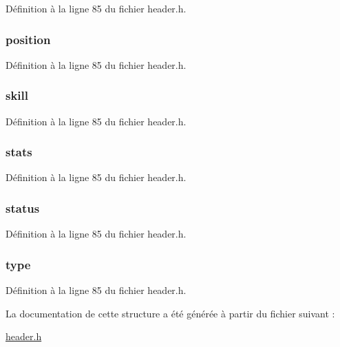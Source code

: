 Définition à la ligne 85 du fichier header.\-h.

\hypertarget{structt__character_a27c93348dcaa3ea78282fb5ef6ce371b}{
\subsubsection[{position}]{ position}}\label{structt__character_a27c93348dcaa3ea78282fb5ef6ce371b}


Définition à la ligne 85 du fichier header.\-h.

\hypertarget{structt__character_ae7aa14804e69b1bc9652c16261da0c9f}{
\subsubsection[{skill}]{ skill}}\label{structt__character_ae7aa14804e69b1bc9652c16261da0c9f}


Définition à la ligne 85 du fichier header.\-h.

\hypertarget{structt__character_a29711825af64d428d19df366a5056670}{
\subsubsection[{stats}]{ stats}}\label{structt__character_a29711825af64d428d19df366a5056670}


Définition à la ligne 85 du fichier header.\-h.

\hypertarget{structt__character_a3ade6b90793e915ca28b52fb70e58e3f}{
\subsubsection[{status}]{ status}}\label{structt__character_a3ade6b90793e915ca28b52fb70e58e3f}


Définition à la ligne 85 du fichier header.\-h.

\hypertarget{structt__character_a3b5fecb9824668aab778f82005089942}{
\subsubsection[{type}]{ type}}\label{structt__character_a3b5fecb9824668aab778f82005089942}


Définition à la ligne 85 du fichier header.\-h.



La documentation de cette structure a été générée à partir du fichier suivant \-:\begin{DoxyCompactItemize}
\item 
\hyperlink{header_8h}{header.\-h}\end{DoxyCompactItemize}
